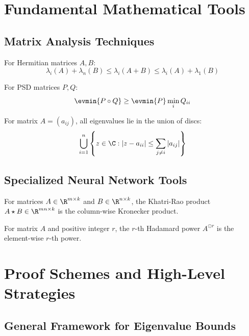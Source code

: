 \documentclass[a4paper]{article}
\begin{document}
\section{Fundamental Mathematical Tools}

\subsection{Matrix Analysis Techniques}

\begin{lemma}
For Hermitian matrices $A, B$:
$$\lambda_i(A) + \lambda_n(B) \leq \lambda_i(A + B) \leq \lambda_i(A) + \lambda_1(B)$$
\end{lemma}

\begin{lemma}
For PSD matrices $P, Q$:
$$\evmin{P \circ Q} \geq \evmin{P} \min_i Q_{ii}$$
\end{lemma}

\begin{lemma}
For matrix $A = (a_{ij})$, all eigenvalues lie in the union of discs:
$$\bigcup_{i=1}^n \left\{z \in \C : |z - a_{ii}| \leq \sum_{j \neq i} |a_{ij}|\right\}$$
\end{lemma}

\subsection{Specialized Neural Network Tools}

\begin{definition}
For matrices $A \in \R^{m \times k}$ and $B \in \R^{n \times k}$, the Khatri-Rao product $A \star B \in \R^{mn \times k}$ is the column-wise Kronecker product.
\end{definition}

\begin{definition}
For matrix $A$ and positive integer $r$, the $r$-th Hadamard power $A^{\odot r}$ is the element-wise $r$-th power.
\end{definition}

\newpage

\section{Proof Schemes and High-Level Strategies}

\subsection{General Framework for Eigenvalue Bounds}
\end{document}
